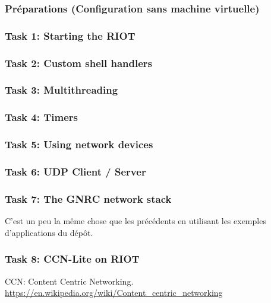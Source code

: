 \subsubsection{Préparations (Configuration sans machine virtuelle)}


\subsubsection{Task 1: Starting the RIOT}


\subsubsection{Task 2: Custom shell handlers}


\subsubsection{Task 3: Multithreading}


\subsubsection{Task 4: Timers}


\subsubsection{Task 5: Using network devices}


\subsubsection{Task 6: UDP Client / Server}


\subsubsection{Task 7: The GNRC network stack}
C'est un peu la même chose que les précédents en utilisant les
exemples d'applications du dépôt.

\subsubsection{Task 8: CCN-Lite on RIOT}
CCN: Content Centric Networking.\\
\url{https://en.wikipedia.org/wiki/Content_centric_networking}

